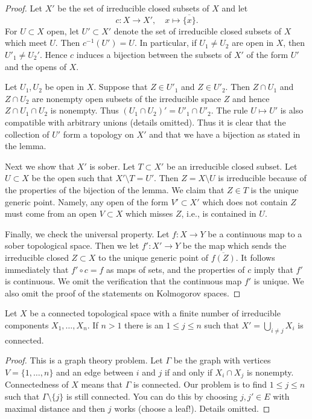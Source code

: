 \begin{proof}
Let $X'$ be the set of irreducible closed subsets of $X$ and let
$$
c : X \to X', \quad x \mapsto \overline{\{x\}}.
$$
For $U \subset X$ open, let $U' \subset X'$ denote the set
of irreducible closed subsets of $X$ which meet $U$.
Then $c^{-1}(U') = U$. In particular, if $U_1 \not = U_2$ are open in
$X$, then $U'_1 \not = U_2'$. Hence $c$ induces
a bijection between the subsets of $X'$ of the form $U'$ and the
opens of $X$.

\medskip\noindent
Let $U_1, U_2$ be open in $X$. Suppose that $Z \in U'_1$ and
$Z \in U'_2$. Then $Z \cap U_1$ and $Z \cap U_2$ are nonempty
open subsets of the irreducible space $Z$ and hence $Z \cap U_1 \cap U_2$
is nonempty. Thus $(U_1 \cap U_2)' = U'_1 \cap U'_2$.
The rule $U \mapsto U'$ is also compatible with arbitrary unions
(details omitted). Thus it is clear that the collection of
$U'$ form a topology on $X'$ and that we have a bijection as
stated in the lemma.

\medskip\noindent
Next we show that $X'$ is sober. Let $T \subset X'$ be an irreducible
closed subset. Let $U \subset X$ be the open such that $X' \setminus T = U'$.
Then $Z = X \setminus U$ is irreducible because of the properties
of the bijection of the lemma. We claim that $Z \in T$ is the unique generic
point. Namely, any open of the form $V' \subset X'$
which does not contain $Z$ must come from an open $V \subset X$
which misses $Z$, i.e., is contained in $U$.

\medskip\noindent
Finally, we check the universal property. Let $f : X \to Y$ be a continuous
map to a sober topological space. Then we let $f' : X' \to Y$ be the map
which sends the irreducible closed $Z \subset X$ to the unique generic
point of $\overline{f(Z)}$. It follows immediately that
$f' \circ c = f$ as maps of sets, and the properties of $c$ imply that
$f'$ is continuous. We omit the verification that the continuous
map $f'$ is unique. We also omit the proof of the statements on
Kolmogorov spaces.
\end{proof}

\begin{lemma}
\label{lemma-remove-irreducible-connected}
Let $X$ be a connected topological space with a finite number of
irreducible components $X_1, \ldots, X_n$. If $n > 1$ there is an
$1 \leq j \leq n$ such that $X' = \bigcup_{i \not = j} X_i$ is connected.
\end{lemma}

\begin{proof}
This is a graph theory problem. Let $\Gamma$ be the graph with vertices
$V = \{1, \ldots, n\}$ and an edge between $i$ and $j$ if and only if
$X_i \cap X_j$ is nonempty. Connectedness of $X$ means that $\Gamma$
is connected. Our problem is to find $1 \leq j \leq n$ such that
$\Gamma \setminus \{j\}$ is still connected. You can do this by choosing
$j, j' \in E$ with maximal distance and then $j$ works (choose a leaf!).
Details omitted.
\end{proof}



